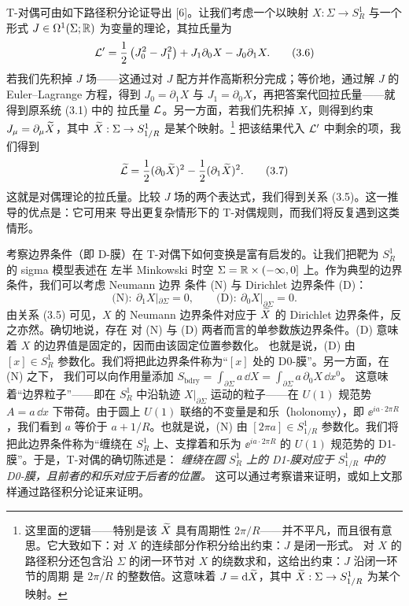 T-对偶可由如下路径积分论证导出 [6]。让我们考虑一个以映射 $X:\Sigma\to S^1_R$ 与一个形式
$J\in\Omega^1(\Sigma;\mathbb{R})$ 为变量的理论，其拉氏量为
\begin{equation}
  \mathcal{L}'=\frac{1}{2}\left(J_0^2-J_1^2\right)+J_1\partial_0X-J_0\partial_1X. \tag{3.6}
\end{equation}
若我们先积掉 $J$ 场——这通过对 $J$ 配方并作高斯积分完成；等价地，通过解 $J$ 的 Euler–Lagrange
方程，得到 $J_0=\partial_1X$ 与 $J_1=\partial_0X$，再把答案代回拉氏量——就得到原系统 (3.1) 中的
拉氏量 $\mathcal{L}$。另一方面，若我们先积掉 $X$，则得到约束 $J_\mu=\partial_\mu\widetilde{X}$，其中
$\widetilde{X}:\Sigma\to S^1_{1/R}$ 是某个映射。\footnote{这里面的逻辑——特别是该 $\widetilde{X}$ 具有周期性
$2\pi/R$——并不平凡，而且很有意思。它大致如下：对 $X$ 的连续部分作积分给出约束：$J$ 是闭一形式。
对 $X$ 的路径积分还包含沿 $\Sigma$ 的闭一环节对 $X$ 的绕数求和，这给出约束：$J$ 沿闭一环节的周期
是 $2\pi/R$ 的整数倍。这意味着 $J=\mathrm{d}\widetilde{X}$，其中 $\widetilde{X}:\Sigma\to S^1_{1/R}$ 为某个映射。}
把该结果代入 $\mathcal{L}'$ 中剩余的项，我们得到
\begin{equation}
  \widetilde{\mathcal{L}}=\frac{1}{2}(\partial_0\widetilde{X})^2-\frac{1}{2}(\partial_1\widetilde{X})^2. \tag{3.7}
\end{equation}
这就是对偶理论的拉氏量。比较 $J$ 场的两个表达式，我们得到关系 (3.5)。这一推导的优点是：它可用来
导出更复杂情形下的 T-对偶规则，而我们将反复遇到这类情形。


考察边界条件（即 D-膜）在 T-对偶下如何变换是富有启发的。让我们把靶为 $S^1_R$ 的 sigma 模型表述在
左半 Minkowski 时空 $\Sigma=\mathbb{R}\times(-\infty,0]$ 上。作为典型的边界条件，我们可以考虑 Neumann 边界
条件 (N) 与 Dirichlet 边界条件 (D)：
\begin{equation}
  \text{(N)}:\ \partial_1X|_{\partial\Sigma}=0,\qquad
  \text{(D)}:\ \partial_0X|_{\partial\Sigma}=0. \tag{3.8}
\end{equation}
由关系 (3.5) 可见，$X$ 的 Neumann 边界条件对应于 $\widetilde{X}$ 的 Dirichlet 边界条件，反之亦然。确切地说，存在
对 (N) 与 (D) 两者而言的单参数族边界条件。(D) 意味着 $X$ 的边界值是固定的，因而由该固定位置参数化。
也就是说，(D) 由 $[x]\in S^1_R$ 参数化。我们将把此边界条件称为“$[x]$ 处的 D0-膜”。另一方面，在 (N) 之下，
我们可以向作用量添加 $S_{\mathrm{bdry}}=\int_{\partial\Sigma}a\,\dd X=\int_{\partial\Sigma}a\,\partial_0X\,\dd x^0$。
这意味着“边界粒子”——即在 $S^1_R$ 中沿轨迹 $X|_{\partial\Sigma}$ 运动的粒子——在 $U(1)$ 规范势
$A=a\,\dd x$ 下带荷。由于圆上 $U(1)$ 联络的不变量是和乐（holonomy），即 $\ee^{ia\cdot2\pi R}$，我们看到
$a$ 等价于 $a+1/R$。也就是说，(N) 由 $[2\pi a]\in S^1_{1/R}$ 参数化。我们将把此边界条件称为“缠绕在
$S^1_R$ 上、支撑着和乐为 $\ee^{ia\cdot2\pi R}$ 的 $U(1)$ 规范势的 D1-膜”。于是，T-对偶的确切陈述是：
\emph{缠绕在圆 $S^1_R$ 上的 D1-膜对应于 $S^1_{1/R}$ 中的 D0-膜，且前者的和乐对应于后者的位置。}
这可以通过考察谱来证明，或如上文那样通过路径积分论证来证明。


